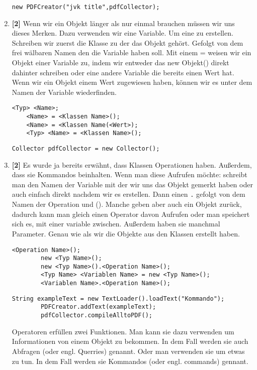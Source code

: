 \begin{enumerate}
    \begin{lstlisting}[title=\textbf{Beispiel (1/3) Konstruktor},firstnumber=2,frame=lr]
        new PDFCreator("jvk title",pdfCollector);
    \end{lstlisting}
    \item \textbf{[2]} Wenn wir ein Objekt länger als nur einmal brauchen müssen wir uns dieses Merken. Dazu verwenden wir eine Variable. Um eine zu erstellen. Schreiben wir zuerst die Klasse zu der das Objekt gehört. Gefolgt von dem frei wälbaren Namen den die Variable haben soll. Mit einem = weisen wir ein Objekt einer Variable zu, indem wir entweder das new Objekt() direkt dahinter schreiben oder eine andere
          Variable die bereits einen Wert hat.
          Wenn wir ein Objekt einem Wert zugewiesen haben, können wir es unter dem Namen der Variable wiederfinden.
          \begin{lstlisting}[title=\textbf{Variablen Syntax}]
    <Typ> <Name>;
    <Name> = <Klassen Name>();
    <Name> = <Klassen Name(<Wert>);
    <Typ> <Name> = <Klassen Name>();
          \end{lstlisting}
          \begin{lstlisting}[title=\textbf{Beispiel (2/3) Variablen},firstnumber=1,frame=ltr]
            Collector pdfCollector = new Collector();
        \end{lstlisting}
    \item \textbf{[2]} Es wurde ja bereits erwähnt, dass Klassen Operationen haben. Außerdem, dass sie  Kommandos beinhalten. Wenn man diese Aufrufen möchte: schreibt man den Namen der Variable mit der wir uns das Objekt gemerkt haben oder auch einfach direkt nachdem wir es erstellen. Dann einen \lstinline{.} gefolgt von dem Namen der Operation und (). Manche geben aber auch ein Objekt zurück, dadurch kann man gleich einen Operator davon Aufrufen oder man speichert sich es, mit einer variable zwischen. Außerdem haben sie manchmal Parameter. Genau wie als wir die Objekte aus den Klassen erstellt haben.
          \begin{lstlisting}[title=\textbf{Kommando Syntax},firstnumber=4]
        <Operation Name>();
        new <Typ Name>();
        new <Typ Name>().<Operation Name>();
        <Typ Name> <Variablen Name> = new <Typ Name>();
        <Variablen Name>.<Operation Name>();
            \end{lstlisting}
          \begin{lstlisting}[title=\textbf{Beispiel 3/3 Kommandos},firstnumber=3,frame=lbr]
        String exampleText = new TextLoader().loadText("Kommando");
        PDFCreator.addText(exampleText);
        pdfCollector.compileAlltoPDF();
              \end{lstlisting}
          \begin{Infobox}[Operationen]
              Operatoren erfüllen zwei Funktionen. Man kann sie dazu verwenden um Informationen von einem Objekt zu bekommen.
              In dem Fall werden sie auch Abfragen (oder engl. Querries) genannt.
              Oder man verwenden sie um etwas zu tun. In dem Fall werden sie Kommandos (oder engl. commands) gennant.
          \end{Infobox}


\end{enumerate}
